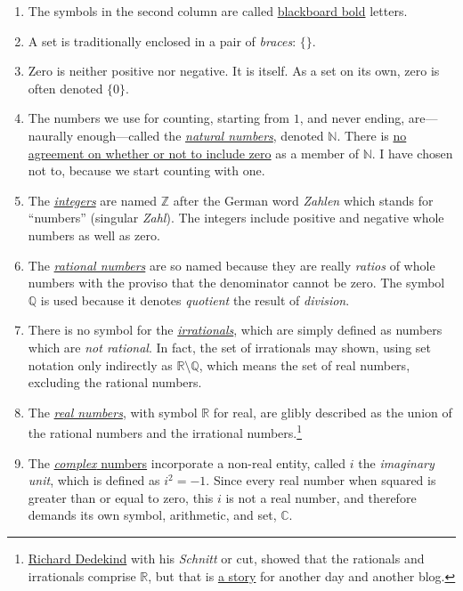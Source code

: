 \documentclass[
  a4paper,
]{article}
\begin{document}
\begin{enumerate}
\item
  The symbols in the second column are called
  \href{https://oeis.org/wiki/Blackboard_bold}{blackboard bold} letters.
\item
  A set is traditionally enclosed in a pair of \emph{braces}: \(\{\}\).
\item
  Zero is neither positive nor negative. It is itself. As a set on its
  own, zero is often denoted \(\{0\}\).
\item
  The numbers we use for counting, starting from \(1\), and never
  ending, are---naurally enough---called the
  \href{https://mathworld.wolfram.com/NaturalNumber.html}{\emph{natural
  numbers}}, denoted \(\mathbb{N}\). There is
  \href{https://en.wikipedia.org/wiki/Natural_number}{no agreement on
  whether or not to include zero} as a member of \(\mathbb{N}\). I have
  chosen not to, because we start counting with one.
\item
  The \href{https://en.wikipedia.org/wiki/Integer}{\emph{integers}} are
  named \(\mathbb{Z}\) after the German word \emph{Zahlen} which stands
  for ``numbers'' (singular \emph{Zahl}). The integers include positive
  and negative whole numbers as well as zero.
\item
  The
  \href{https://mathworld.wolfram.com/RationalNumber.html}{\emph{rational
  numbers}} are so named because they are really \emph{ratios} of whole
  numbers with the proviso that the denominator cannot be zero. The
  symbol \(\mathbb{Q}\) is used because it denotes \emph{quotient} the
  result of \emph{division}.
\item
  There is no symbol for the
  \href{https://mathworld.wolfram.com/IrrationalNumber.html}{\emph{irrationals}},
  which are simply defined as numbers which are \emph{not rational}. In
  fact, the set of irrationals may shown, using set notation only
  indirectly as \(\mathbb{R}\setminus\mathbb{Q}\), which means the set
  of real numbers, excluding the rational numbers.
\item
  The \href{https://en.wikipedia.org/wiki/Real_number}{\emph{real
  numbers}}, with symbol \(\mathbb{R}\) for real, are glibly described
  as the union of the rational numbers and the irrational
  numbers.\footnote{\href{https://en.wikipedia.org/wiki/Richard_Dedekind}{Richard
    Dedekind} with his \emph{Schnitt} or cut, showed that the rationals
    and irrationals comprise \(\mathbb{R}\), but that is
    \href{https://arpita95b.medium.com/cutting-through-the-confusion-how-dedekind-cuts-build-the-real-numbers-20aeaaec021d}{a
    story} for another day and another blog.}
\item
  The \href{https://en.wikipedia.org/wiki/Complex_number}{\emph{complex}
  numbers} incorporate a non-real entity, called \(i\) the
  \emph{imaginary unit}, which is defined as \(i^2 = -1\). Since every
  real number when squared is greater than or equal to zero, this \(i\)
  is not a real number, and therefore demands its own symbol,
  arithmetic, and set, \(\mathbb{C}\).
\end{enumerate}
\end{document}
